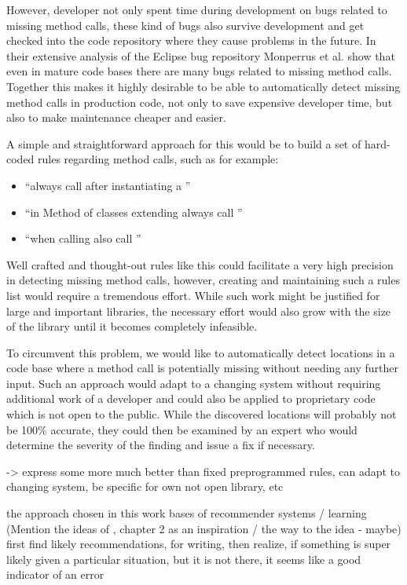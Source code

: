 However, developer not only spent time during development on bugs related to missing method calls, these kind of bugs also survive development and get checked into the code repository where they cause problems in the future.
In their extensive analysis of the Eclipse bug repository Monperrus et al. \cite{monperrus2013detecting} show that even in mature code bases there are many bugs related to missing method calls.
Together this makes it highly desirable to be able to automatically detect missing method calls in production code, not only to save expensive developer time, but also to make maintenance cheaper and easier.

A simple and straightforward approach for this would be to build a set of hard-coded rules regarding method calls, such as for example:
\begin{itemize}
    \item ``always call  after instantiating a ''
    \item ``in Method  of classes extending  always call ''
    \item ``when calling  also call ''
\end{itemize}
Well crafted and thought-out rules like this could facilitate a very high precision in detecting missing method calls, however, creating and maintaining such a rules list would require a tremendous effort.
While such work might be justified for large and important libraries, the necessary effort would also grow with the size of the library until it becomes completely infeasible.

To circumvent this problem, we would like to automatically detect locations in a code base where a method call is potentially missing without needing any further input.
Such an approach would adapt to a changing system without requiring additional work of a developer and could also be applied to proprietary code which is not open to the public.
While the discovered locations will probably not be 100\% accurate, they could then be examined by an expert who would determine the severity of the finding and issue a fix if necessary.

-> express some more much better than fixed preprogrammed rules, can adapt to changing system, be specific for own not open library, etc

the approach chosen in this work bases of recommender systems / learning
(Mention the ideas of \cite{bruch2012ide}, chapter 2 as an inspiration / the way to the idea - maybe)
first find likely recommendations, for writing, then realize, if something is super likely given a particular situation, but it is not there, it seems like a good indicator of an error

